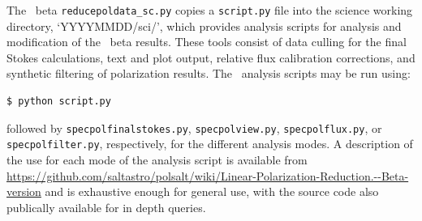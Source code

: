 The \polsalt\ beta \texttt{reducepoldata\_sc.py} copies a \texttt{script.py} file into the science working directory, `YYYYMMDD/sci/', which provides analysis scripts for analysis and modification of the \polsalt\ beta results. These tools consist of data culling for the final Stokes calculations, text and plot output, relative flux calibration corrections, and synthetic filtering of polarization results. The \polsalt\ analysis scripts may be run using:
\begin{lstlisting}[language=bash]
$ python script.py
\end{lstlisting}
{\parskip=0pt followed} by \texttt{specpolfinalstokes.py}, \texttt{specpolview.py}, \texttt{specpolflux.py}, or \texttt{specpol\-filter.py}, respectively, for the different analysis modes. A description of the use for each mode of the analysis script is available from \url{https://github.com/saltastro/polsalt/wiki/Linear-Polarization-Reduction.--Beta-version} and is exhaustive enough for general use, with the source code also publically available for in depth queries.

